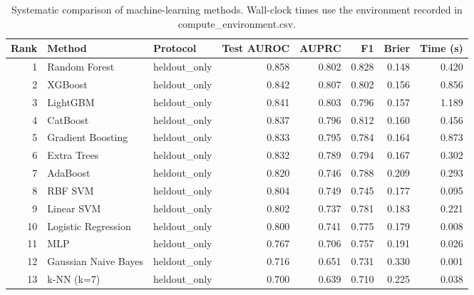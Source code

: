 \begin{table}[htbp]
\centering
\caption{Systematic comparison of machine-learning methods. Wall-clock times use the environment recorded in compute_environment.csv.}
\label{tab:method_comparison_recomputed}
\begin{tabular}{rllrrrrr}
\toprule
Rank & Method & Protocol & Test AUROC & AUPRC & F1 & Brier & Time (s) \\
\midrule
1 & Random Forest & heldout\_only & 0.858 & 0.802 & 0.828 & 0.148 & 0.420 \\
2 & XGBoost & heldout\_only & 0.842 & 0.807 & 0.802 & 0.156 & 0.856 \\
3 & LightGBM & heldout\_only & 0.841 & 0.803 & 0.796 & 0.157 & 1.189 \\
4 & CatBoost & heldout\_only & 0.837 & 0.796 & 0.812 & 0.160 & 0.456 \\
5 & Gradient Boosting & heldout\_only & 0.833 & 0.795 & 0.784 & 0.164 & 0.873 \\
6 & Extra Trees & heldout\_only & 0.832 & 0.789 & 0.794 & 0.167 & 0.302 \\
7 & AdaBoost & heldout\_only & 0.820 & 0.746 & 0.788 & 0.209 & 0.293 \\
8 & RBF SVM & heldout\_only & 0.804 & 0.749 & 0.745 & 0.177 & 0.095 \\
9 & Linear SVM & heldout\_only & 0.802 & 0.737 & 0.781 & 0.183 & 0.221 \\
10 & Logistic Regression & heldout\_only & 0.800 & 0.741 & 0.775 & 0.179 & 0.008 \\
11 & MLP & heldout\_only & 0.767 & 0.706 & 0.757 & 0.191 & 0.026 \\
12 & Gaussian Naive Bayes & heldout\_only & 0.716 & 0.651 & 0.731 & 0.330 & 0.001 \\
13 & k-NN (k=7) & heldout\_only & 0.700 & 0.639 & 0.710 & 0.225 & 0.038 \\
\bottomrule
\end{tabular}

\end{table}

